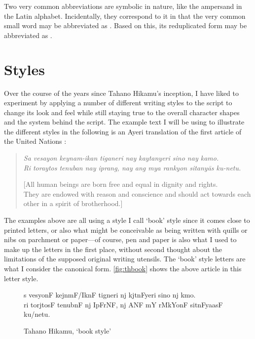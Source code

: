 Two very common abbreviations are symbolic in nature, like the ampersand
\orth{\&} in the Latin alphabet. Incidentally, they correspond to it in
that the very common small word  may be abbreviated as
\ayr{\&}. Based on this, its reduplicated form  may be abbreviated as \ayr{+}.


\section{Styles}

Over the course of the years since Tahano Hikamu's inception, I have liked to
experiment by applying a number of different writing styles to the script to
change its look and feel while still staying true to the overall character
shapes and the system behind the script. The example text I will be using to
illustrate the different styles in the following is an Ayeri translation of the
first article of the United Nations
 \citep{benung:udhr}:

\blockcquote[Article 1]{udhr}{\textit{Sa vesayon keynam-ikan tiganeri nay
kaytanyeri sino nay kamo.\\
Ri toraytos tenuban nay iprang, nay ang mya rankyon sitanyās ku-netu.}

[All human beings are born free and equal in dignity and rights.\\
They are endowed with reason and conscience and should act towards each other 
in a spirit of brotherhood.]}

The examples above are all using a
style I call `book' style since it comes close to printed letters, or also what
might be conceivable as being written with quills or nibs on parchment or 
paper---of course, pen and paper is also what I used to make up the letters in
the first place, without second thought about the limitations of the supposed
original writing utensils. The `book' style letters are what I consider the
canonical form. \autoref{fig:thbook} shows the above article in this letter
style.

\begin{figure}[ht]\centering
{\Tagati\Large s vesyonF kejnmF/IknF tigneri nj kjtnFyeri sino nj kmo.\\
ri torjtosF tenubnF nj IpFrNF, nj ANF mY rMkYonF sitnFyaasF 
ku/netu.}
\caption{Tahano Hikamu, `book style'}
\label{fig:thbook}
\end{figure}

